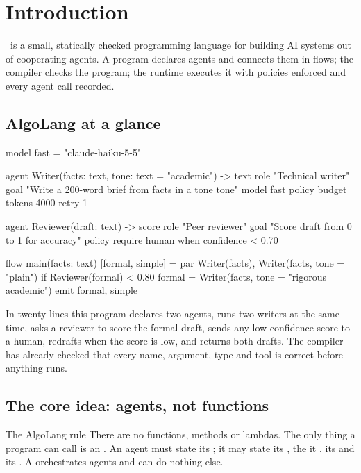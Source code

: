 \chapter{Introduction}
\label{ch:intro}

\algolang\ is a small, statically checked programming language for building AI systems out of cooperating agents. A program declares agents and connects them in flows; the compiler checks the program; the runtime executes it with policies enforced and every agent call recorded.

\section{AlgoLang at a glance}

\begin{algo}[title=brief.algo]
model fast = "claude-haiku-5-5"

agent Writer(facts: text, tone: text = "academic") -> text {
    role  "Technical writer"
    goal  "Write a 200-word brief from {facts} in a {tone} tone"
    model fast
    policy { budget tokens 4000  retry 1 }
}

agent Reviewer(draft: text) -> score {
    role  "Peer reviewer"
    goal  "Score {draft} from 0 to 1 for accuracy"
    policy { require human when confidence < 0.70 }
}

flow main(facts: text) {
    [formal, simple] = par { Writer(facts), Writer(facts, tone = "plain") }
    if Reviewer(formal) < 0.80 {
        formal = Writer(facts, tone = "rigorous academic")
    }
    emit formal, simple
}
\end{algo}

In twenty lines this program declares two agents, runs two writers at the same time, asks a reviewer to score the formal draft, sends any low-confidence score to a human, redrafts when the score is low, and returns both drafts. The compiler has already checked that every name, argument, type and tool is correct before anything runs.

\section{The core idea: agents, not functions}

\begin{definitionbox}{The AlgoLang rule}
There are no functions, methods or lambdas. The only thing a program can call is an . An agent must state its ; it may state its , the  it , its  and its . A  orchestrates agents and can do nothing else.
\end{definitionbox}

